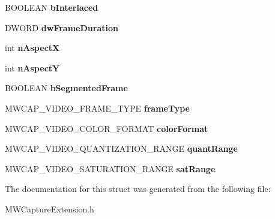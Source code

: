\begin{DoxyCompactItemize}
\item 
\hypertarget{struct__MWCAP__VIDEO__SIGNAL__STATUS_ab5f18b9c82252aa7d399e7f9f2698a34}{B\-O\-O\-L\-E\-A\-N {\bfseries b\-Interlaced}}\label{struct__MWCAP__VIDEO__SIGNAL__STATUS_ab5f18b9c82252aa7d399e7f9f2698a34}

\item 
\hypertarget{struct__MWCAP__VIDEO__SIGNAL__STATUS_ad0c8c7a7efa07258807aff30653af867}{D\-W\-O\-R\-D {\bfseries dw\-Frame\-Duration}}\label{struct__MWCAP__VIDEO__SIGNAL__STATUS_ad0c8c7a7efa07258807aff30653af867}

\item 
\hypertarget{struct__MWCAP__VIDEO__SIGNAL__STATUS_ac29f9026e51cd2b703fd9e333c1705c0}{int {\bfseries n\-Aspect\-X}}\label{struct__MWCAP__VIDEO__SIGNAL__STATUS_ac29f9026e51cd2b703fd9e333c1705c0}

\item 
\hypertarget{struct__MWCAP__VIDEO__SIGNAL__STATUS_ae31917e61fc36a798f308c4db6563d33}{int {\bfseries n\-Aspect\-Y}}\label{struct__MWCAP__VIDEO__SIGNAL__STATUS_ae31917e61fc36a798f308c4db6563d33}

\item 
\hypertarget{struct__MWCAP__VIDEO__SIGNAL__STATUS_a698827d47690cc17c2347e94ad1037a7}{B\-O\-O\-L\-E\-A\-N {\bfseries b\-Segmented\-Frame}}\label{struct__MWCAP__VIDEO__SIGNAL__STATUS_a698827d47690cc17c2347e94ad1037a7}

\item 
\hypertarget{struct__MWCAP__VIDEO__SIGNAL__STATUS_a7364ead9599121d638bec7e2c25d6762}{M\-W\-C\-A\-P\-\_\-\-V\-I\-D\-E\-O\-\_\-\-F\-R\-A\-M\-E\-\_\-\-T\-Y\-P\-E {\bfseries frame\-Type}}\label{struct__MWCAP__VIDEO__SIGNAL__STATUS_a7364ead9599121d638bec7e2c25d6762}

\item 
\hypertarget{struct__MWCAP__VIDEO__SIGNAL__STATUS_af86d2cf62c711498e8255610c7fa1325}{M\-W\-C\-A\-P\-\_\-\-V\-I\-D\-E\-O\-\_\-\-C\-O\-L\-O\-R\-\_\-\-F\-O\-R\-M\-A\-T {\bfseries color\-Format}}\label{struct__MWCAP__VIDEO__SIGNAL__STATUS_af86d2cf62c711498e8255610c7fa1325}

\item 
\hypertarget{struct__MWCAP__VIDEO__SIGNAL__STATUS_a68fdfed3320acf15177fb0ebcee7ac9b}{M\-W\-C\-A\-P\-\_\-\-V\-I\-D\-E\-O\-\_\-\-Q\-U\-A\-N\-T\-I\-Z\-A\-T\-I\-O\-N\-\_\-\-R\-A\-N\-G\-E {\bfseries quant\-Range}}\label{struct__MWCAP__VIDEO__SIGNAL__STATUS_a68fdfed3320acf15177fb0ebcee7ac9b}

\item 
\hypertarget{struct__MWCAP__VIDEO__SIGNAL__STATUS_a03c47d0619ec9d6f78469b9a99f5b97e}{M\-W\-C\-A\-P\-\_\-\-V\-I\-D\-E\-O\-\_\-\-S\-A\-T\-U\-R\-A\-T\-I\-O\-N\-\_\-\-R\-A\-N\-G\-E {\bfseries sat\-Range}}\label{struct__MWCAP__VIDEO__SIGNAL__STATUS_a03c47d0619ec9d6f78469b9a99f5b97e}

\end{DoxyCompactItemize}


The documentation for this struct was generated from the following file\-:\begin{DoxyCompactItemize}
\item 
M\-W\-Capture\-Extension.\-h\end{DoxyCompactItemize}
